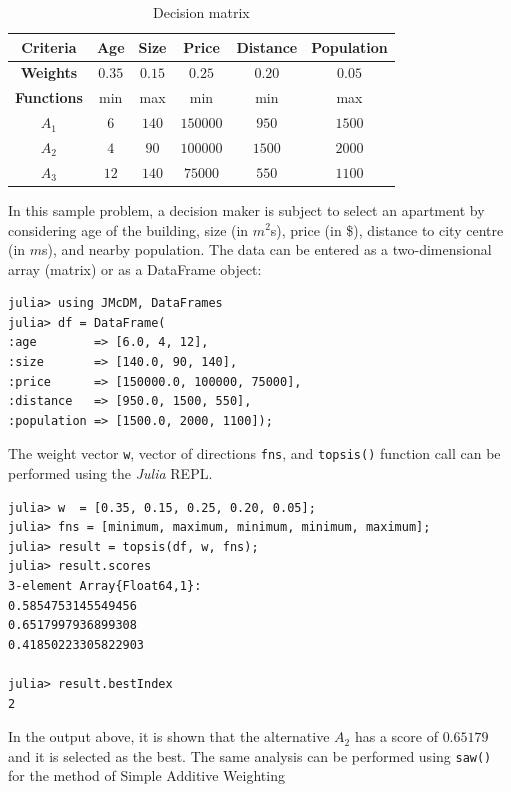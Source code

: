 \documentclass[preprint,review, 12pt, a4paper]{elsarticle}
\begin{document}
\begin{table}[H]
	\centering
	\begin{tabular}{|c|c|c|c|c|c|}
		\hline
		\textbf{Criteria} & {Age} & {Size} &  {Price} & {Distance} & {Population}\\
		\hline
		\textbf{Weights} & {$0.35$} & {$0.15$} & {$0.25$}& {$0.20$} & {$0.05$} \\
		\hline
		\textbf{Functions} & min  & max & min & min & max\\
		\hline
		\hline
		{$A_1$} & {$6$} & {$140$} & $150000$ & {$950$} & $1500$\\
		\hline
		{$A_2$} & {$4$} & {$90$} & $100000$ & {$1500$} & $2000$\\
		\hline
		{$A_3$} & {$12$} & {$140$} & $75000$ & {$550$} & $1100$\\
		\hline
	\end{tabular}
	\caption{Decision matrix}
	\label{table:example_problem} 
\end{table}

In this sample problem, a decision maker is subject to select an apartment by considering age of the building, size (in $m^2$s), price (in \$), distance to city centre (in $m$s), and nearby population.
The data can be entered as a two-dimensional array (matrix) or as a DataFrame object:

\begin{verbatim}
julia> using JMcDM, DataFrames
julia> df = DataFrame(
:age        => [6.0, 4, 12],
:size       => [140.0, 90, 140],
:price      => [150000.0, 100000, 75000],
:distance   => [950.0, 1500, 550],
:population => [1500.0, 2000, 1100]);
\end{verbatim}

\noindent The weight vector \texttt{w}, vector of directions \texttt{fns}, and \texttt{topsis()} function call can be performed using the \emph{Julia} REPL.

\begin{verbatim}
julia> w  = [0.35, 0.15, 0.25, 0.20, 0.05];
julia> fns = [minimum, maximum, minimum, minimum, maximum];
julia> result = topsis(df, w, fns);
julia> result.scores
3-element Array{Float64,1}:
0.5854753145549456
0.6517997936899308
0.41850223305822903

julia> result.bestIndex
2
\end{verbatim}

\noindent In the output above, it is shown that the alternative $A_2$ has a score of $0.65179$ and it is selected as the best. The same analysis can be performed using \texttt{saw()} for the method of Simple Additive Weighting
\end{document}
